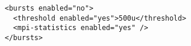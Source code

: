 \begin{verbatim}
<bursts enabled="no">
  <threshold enabled="yes">500u</threshold>
  <mpi-statistics enabled="yes" />
</bursts>
\end{verbatim}
